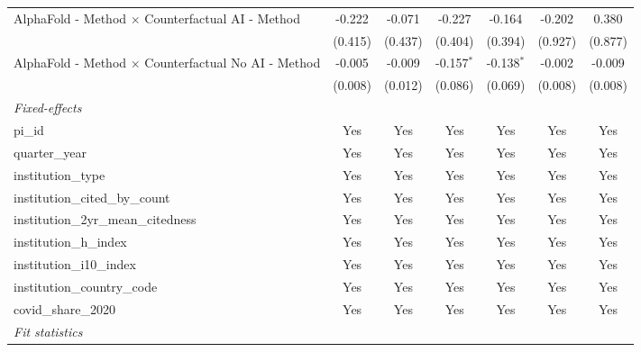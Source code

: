 \begin{tabular}{lcccccc}
   AlphaFold - Method $\times$ Counterfactual AI - Method      & -0.222        & -0.071      & -0.227         & -0.164        & -0.202       & 0.380\\   
                                                               & (0.415)       & (0.437)     & (0.404)        & (0.394)       & (0.927)      & (0.877)\\   
   AlphaFold - Method $\times$ Counterfactual No AI - Method   & -0.005        & -0.009      & -0.157$^{*}$   & -0.138$^{*}$  & -0.002       & -0.009\\   
                                                               & (0.008)       & (0.012)     & (0.086)        & (0.069)       & (0.008)      & (0.008)\\   
   \midrule
   \emph{Fixed-effects}\\
   pi\_id                                                      & Yes           & Yes         & Yes            & Yes           & Yes          & Yes\\  
   quarter\_year                                               & Yes           & Yes         & Yes            & Yes           & Yes          & Yes\\  
   institution\_type                                           & Yes           & Yes         & Yes            & Yes           & Yes          & Yes\\  
   institution\_cited\_by\_count                               & Yes           & Yes         & Yes            & Yes           & Yes          & Yes\\  
   institution\_2yr\_mean\_citedness                           & Yes           & Yes         & Yes            & Yes           & Yes          & Yes\\  
   institution\_h\_index                                       & Yes           & Yes         & Yes            & Yes           & Yes          & Yes\\  
   institution\_i10\_index                                     & Yes           & Yes         & Yes            & Yes           & Yes          & Yes\\  
   institution\_country\_code                                  & Yes           & Yes         & Yes            & Yes           & Yes          & Yes\\  
   covid\_share\_2020                                          & Yes           & Yes         & Yes            & Yes           & Yes          & Yes\\  
   \midrule
   \emph{Fit statistics}\\

\end{tabular}
